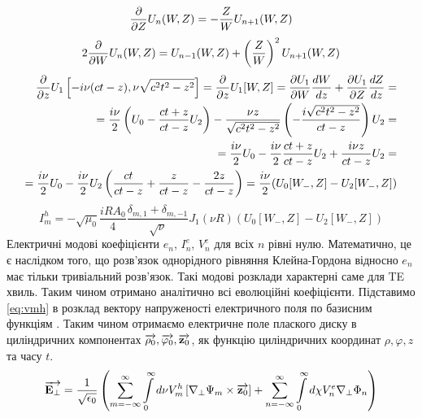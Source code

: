 %
\textcolor{blue} { \begin{equation*} 
\frac{\partial }{\partial Z} U_n (W,Z) = - \frac{Z}{W} U_{n+1} (W,Z)
\end{equation*} }
%
\textcolor{blue} { \begin{equation*}
2 \frac{\partial }{\partial W} U_n (W,Z) = U_{n-1} (W,Z) + 
\left( \frac{Z}{W} \right)^2 U_{n+1} (W,Z)
\end{equation*} }
%
\textcolor{blue} { \begin{equation*} \begin{aligned}
\frac{\partial }{\partial z} U_1 \left[ -i \nu (ct-z), \nu \sqrt{c^2t^2-z^2} \right] =
\frac{\partial }{\partial z} U_1[W,Z] = \frac{\partial U_1}{\partial W} \frac{d W}{d z} + 
\frac{\partial U_1}{\partial Z} \frac{d Z}{d z} = \\
= \frac{i \nu}{2} \left( U_0 - \frac{ct+z}{ct-z} U_2 \right) -
\frac{\nu z}{\sqrt{c^2t^2 - z^2}} 
\left( - \frac{i \sqrt{c^2t^2-z^2}}{ct-z} \right) U_2 = \\
= \frac{i \nu}{2} U_0 - \frac{i \nu}{2} \frac{ct+z}{ct-z} U_2 +
\frac{i \nu z}{ct-z} U_2 = \\ = \frac{i \nu}{2} U_0 - \frac{i \nu}{2} U_2
\left( \frac{ct}{ct-z} + \frac{z}{ct-z} - \frac{2z}{ct-z} \right) = 
\frac{i \nu}{2} (U_0[W_-,Z] - U_2[W_-,Z])
\end{aligned} \end{equation*} }
%
\begin{equation} \label{eq:imh}
I_{m}^{h} = - \sqrt{\mu_0} \frac{iR A_0}{4} 
\frac{\delta_{m,1} + \delta_{m,-1}}{\sqrt{\nu}} 
J_1 (\nu R) \left( U_0 [ W_-, Z ] - U_2 [ W_-, Z ] \right)
\end{equation}
%
Електричні модові коефіцієнти $ e_n $, $ I_n^e $, $ V_n^e $ для всіх $ n $
рівні нулю. Математично, це є наслідком того, що розв'язок однорідного рівняння 
Клейна-Гордона відносно $ e_n $ має тільки тривіальний розв'язок. Такі модові
розклади характерні саме для TE хвиль.
%
Таким чином отримано аналітично всі еволюційні коефіцієнти. Підставимо
\eqref{eq:vmh} в розклад вектору напруженості електричного поля по
базисним функціям \cite{imp:Dumin2010}. Таким чином отримаємо електричне 
поле плаского диску в циліндричних компонентах 
$ \overrightarrow{\mathbf \rho_0}, \overrightarrow{\mathbf \varphi_0}, \overrightarrow{\mathbf z_0} $, як функцію циліндричних 
координат $ \rho, \varphi, z $ та часу $ t $.
%
\textcolor{blue} { \begin{equation*} \begin{aligned}
\overrightarrow{\mathbf E_\perp} = \frac{1}{\sqrt{\epsilon_0}} \left( 
\sum \limits_{m=-\infty}^{\infty} \int \limits_{0}^{\infty} 
d \nu V_m^h \left[  \nabla_\perp \Psi_m  \times  \overrightarrow{\mathbf z_0}  \right] +
\sum \limits_{n=-\infty}^{\infty} \int \limits_{0}^{\infty}
d \chi V_n^e \nabla_\perp \Phi_n \right)
\end{aligned} \end{equation*} }
